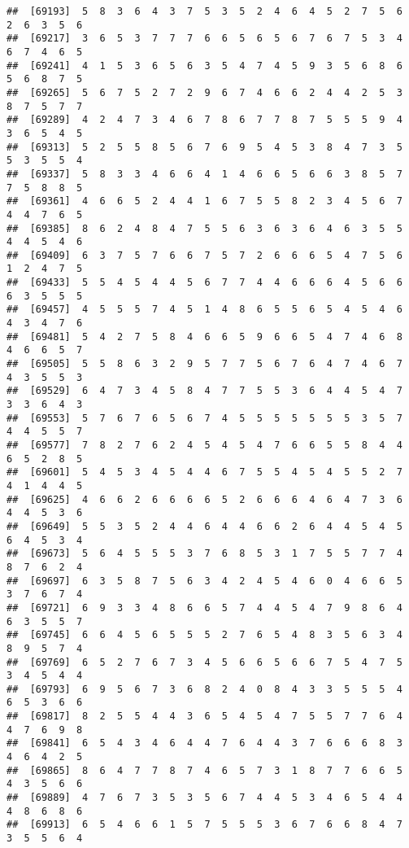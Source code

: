 \documentclass[
]{book}
\begin{document}
\begin{verbatim}
##  [69193]  5  8  3  6  4  3  7  5  3  5  2  4  6  4  5  2  7  5  6  2  6  3  5  6
##  [69217]  3  6  5  3  7  7  7  6  6  5  6  5  6  7  6  7  5  3  4  6  7  4  6  5
##  [69241]  4  1  5  3  6  5  6  3  5  4  7  4  5  9  3  5  6  8  6  5  6  8  7  5
##  [69265]  5  6  7  5  2  7  2  9  6  7  4  6  6  2  4  4  2  5  3  8  7  5  7  7
##  [69289]  4  2  4  7  3  4  6  7  8  6  7  7  8  7  5  5  5  9  4  3  6  5  4  5
##  [69313]  5  2  5  5  8  5  6  7  6  9  5  4  5  3  8  4  7  3  5  5  3  5  5  4
##  [69337]  5  8  3  3  4  6  6  4  1  4  6  6  5  6  6  3  8  5  7  7  5  8  8  5
##  [69361]  4  6  6  5  2  4  4  1  6  7  5  5  8  2  3  4  5  6  7  4  4  7  6  5
##  [69385]  8  6  2  4  8  4  7  5  5  6  3  6  3  6  4  6  3  5  5  4  4  5  4  6
##  [69409]  6  3  7  5  7  6  6  7  5  7  2  6  6  6  5  4  7  5  6  1  2  4  7  5
##  [69433]  5  5  4  5  4  4  5  6  7  7  4  4  6  6  6  4  5  6  6  6  3  5  5  5
##  [69457]  4  5  5  5  7  4  5  1  4  8  6  5  5  6  5  4  5  4  6  4  3  4  7  6
##  [69481]  5  4  2  7  5  8  4  6  6  5  9  6  6  5  4  7  4  6  8  4  6  6  5  7
##  [69505]  5  5  8  6  3  2  9  5  7  7  5  6  7  6  4  7  4  6  7  4  3  5  5  3
##  [69529]  6  4  7  3  4  5  8  4  7  7  5  5  3  6  4  4  5  4  7  3  3  6  4  3
##  [69553]  5  7  6  7  6  5  6  7  4  5  5  5  5  5  5  5  3  5  7  4  4  5  5  7
##  [69577]  7  8  2  7  6  2  4  5  4  5  4  7  6  6  5  5  8  4  4  6  5  2  8  5
##  [69601]  5  4  5  3  4  5  4  4  6  7  5  5  4  5  4  5  5  2  7  4  1  4  4  5
##  [69625]  4  6  6  2  6  6  6  6  5  2  6  6  6  4  6  4  7  3  6  4  4  5  3  6
##  [69649]  5  5  3  5  2  4  4  6  4  4  6  6  2  6  4  4  5  4  5  6  4  5  3  4
##  [69673]  5  6  4  5  5  5  3  7  6  8  5  3  1  7  5  5  7  7  4  8  7  6  2  4
##  [69697]  6  3  5  8  7  5  6  3  4  2  4  5  4  6  0  4  6  6  5  3  7  6  7  4
##  [69721]  6  9  3  3  4  8  6  6  5  7  4  4  5  4  7  9  8  6  4  6  3  5  5  7
##  [69745]  6  6  4  5  6  5  5  5  2  7  6  5  4  8  3  5  6  3  4  8  9  5  7  4
##  [69769]  6  5  2  7  6  7  3  4  5  6  6  5  6  6  7  5  4  7  5  3  4  5  4  4
##  [69793]  6  9  5  6  7  3  6  8  2  4  0  8  4  3  3  5  5  5  4  6  5  3  6  6
##  [69817]  8  2  5  5  4  4  3  6  5  4  5  4  7  5  5  7  7  6  4  4  7  6  9  8
##  [69841]  6  5  4  3  4  6  4  4  7  6  4  4  3  7  6  6  6  8  3  4  6  4  2  5
##  [69865]  8  6  4  7  7  8  7  4  6  5  7  3  1  8  7  7  6  6  5  4  3  5  6  6
##  [69889]  4  7  6  7  3  5  3  5  6  7  4  4  5  3  4  6  5  4  4  4  8  6  8  6
##  [69913]  6  5  4  6  6  1  5  7  5  5  5  3  6  7  6  6  8  4  7  3  5  5  6  4

\end{verbatim}
\end{document}
